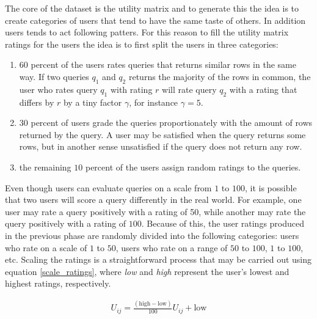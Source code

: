 The core of the dataset is the utility matrix and to generate this the idea is to create categories of users that tend to have the same taste of others. In addition users tends to act following patters. For this reason to fill the utility matrix ratings for the users the idea is to first split the users in three categories:
\begin{enumerate}
    \item $60$ percent of the users rates queries that returns similar rows in the same way. If two queries $q_1$ and $q_2$ returns the majority of the rows in common, the user who rates query $q_1$ with rating $r$ will rate query $q_2$ with a rating that differs by $r$ by a tiny factor $\gamma$, for instance $\gamma = 5$. 
    \item $30$ percent of users grade the queries proportionately with the amount of rows returned by the query. A user may be satisfied when the query returns some rows, but in another sense unsatisfied if the query does not return any row.
    \item the remaining $10$ percent of the users assign random ratings to the queries.
\end{enumerate}

Even though users can evaluate queries on a scale from $1$ to $100$, it is possible that two users will score a query differently in the real world. For example, one user may rate a query positively with a rating of 50, while another may rate the query positively with a rating of $100$. Because of this, the user ratings produced in the previous phase are randomly divided into the following categories: users who rate on a scale of $1$ to $50$, users who rate on a range of $50$ to $100$, $1$ to $100$, etc. Scaling the ratings is a straightforward process that may be carried out using equation \ref{scale_ratings}, where \emph{low} and \emph{high} represent the user's lowest and highest ratings, respectively.  


\begin{equation}
\begin{aligned}
    U_{ij} =  \frac{(\text{high} - \text{low})}{100}  U_{ij} + \text{low}
\end{aligned}
\label{scale_ratings}
\end{equation}




